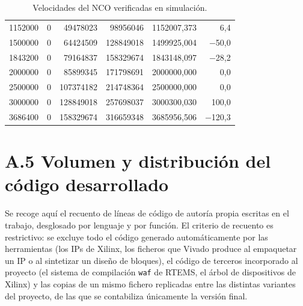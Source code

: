 \begin{table}[H]
\begin{tabular}{rrrrrr}
        1152000 & 0 & 49478023 & 98956046  & 1152007,373 & 6,4 \\
        1500000 & 0 & 64424509 & 128849018 & 1499925,004 & $-$50,0 \\
        1843200 & 0 & 79164837 & 158329674 & 1843148,097 & $-$28,2 \\
        2000000 & 0 & 85899345 & 171798691 & 2000000,000 & 0,0 \\
        2500000 & 0 & 107374182 & 214748364 & 2500000,000 & 0,0 \\
        3000000 & 0 & 128849018 & 257698037 & 3000300,030 & 100,0 \\
        3686400 & 0 & 158329674 & 316659348 & 3685956,506 & $-$120,3 \\
        \hline
    \end{tabular}
    \caption{Velocidades del NCO verificadas en simulación.}
    \label{tab:nco}
\end{table}

\section*{A.5 Volumen y distribución del código desarrollado}

Se recoge aquí el recuento de líneas de código de autoría propia escritas en el trabajo, desglosado
por lenguaje y por función. El criterio de recuento es restrictivo: se excluye todo el código
generado automáticamente por las herramientas (los IPs de Xilinx, los ficheros que Vivado produce al
empaquetar un IP o al sintetizar un diseño de bloques), el código de terceros incorporado al
proyecto (el sistema de compilación \texttt{waf} de RTEMS, el árbol de dispositivos de Xilinx) y las
copias de un mismo fichero replicadas entre las distintas variantes del proyecto, de las que se
contabiliza únicamente la versión final.


